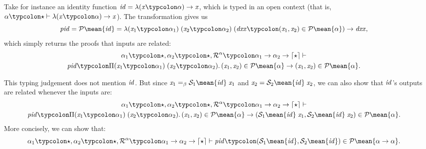\begin{example}
Take for instance an identity function \ensuremath{\Varid{id}\mathrel{=}\lambda (\Varid{x}\typcolon\alpha)\to \Varid{x}}, which is typed
in an open context (that is, \ensuremath{\alpha\typcolon\star\vdash\lambda (\Varid{x}\typcolon\alpha)\to \Varid{x}}).
The transformation gives us
\[\ensuremath{\Varid{pid}\mathrel{=}\mathcal{P}\mean{\Varid{id}}\mathrel{=}\lambda (\Varid{x}_{1}\typcolon\alpha_{1})\;(\Varid{x}_{2}\typcolon\alpha_{2})\;(\Varid{dxx}\typcolon(\Varid{x}_{1},\Varid{x}_{2})\in \mathcal{P}\mean{\alpha})\to \Varid{dxx}},\]
which simply returns the proofs that inputs are related:
\begin{multline*}
\ensuremath{\alpha_{1}\typcolon\star,\alpha_{2}\typcolon\star,\mathcal{R}^\alpha\typcolon\alpha_{1}\to \alpha_{2}\to \lceil \star \rceil\vdash} \\
  \ensuremath{\Varid{pid}\typcolon\Pi (\Varid{x}_{1}\typcolon\alpha_{1})\hsforall \;(\Varid{x}_{2}\typcolon\alpha_{2})\hsdot{\circ }{\mathpunct{.}}(\Varid{x}_{1},\Varid{x}_{2})\in \mathcal{P}\mean{\alpha}\to (\Varid{x}_{1},\Varid{x}_{2})\in \mathcal{P}\mean{\alpha}}.
\end{multline*}

This typing judgement does not mention \ensuremath{\Varid{id}}. But since \ensuremath{\Varid{x}_{1}=_{\beta}\mathcal{S}_1 \mean{\Varid{id}}\;\Varid{x}_{1}} and
\ensuremath{\Varid{x}_{2}\mathrel{=}\mathcal{S}_2 \mean{\Varid{id}}\;\Varid{x}_{2}}, we can also show that \ensuremath{\Varid{id}}'s outputs are related whenever the
inputs are:
\begin{multline*}
\ensuremath{\alpha_{1}\typcolon\star,\alpha_{2}\typcolon\star,\mathcal{R}^\alpha\typcolon\alpha_{1}\to \alpha_{2}\to \lceil \star \rceil\vdash} \\
  \ensuremath{\Varid{pid}\typcolon\Pi (\Varid{x}_{1}\typcolon\alpha_{1})\hsforall \;(\Varid{x}_{2}\typcolon\alpha_{2})\hsdot{\circ }{\mathpunct{.}}(\Varid{x}_{1},\Varid{x}_{2})\in \mathcal{P}\mean{\alpha}\to (\mathcal{S}_1 \mean{\Varid{id}}\;\Varid{x}_{1},\mathcal{S}_2 \mean{\Varid{id}}\;\Varid{x}_{2})\in \mathcal{P}\mean{\alpha}}.
\end{multline*}
More concisely, we can show that:
\[
\ensuremath{\alpha_{1}\typcolon\star,\alpha_{2}\typcolon\star,\mathcal{R}^\alpha\typcolon\alpha_{1}\to \alpha_{2}\to \lceil \star \rceil\vdash\Varid{pid}\typcolon(\mathcal{S}_1 \mean{\Varid{id}},\mathcal{S}_2 \mean{\Varid{id}})\in \mathcal{P}\mean{\alpha\to \alpha}}.
\]
\end{example}

